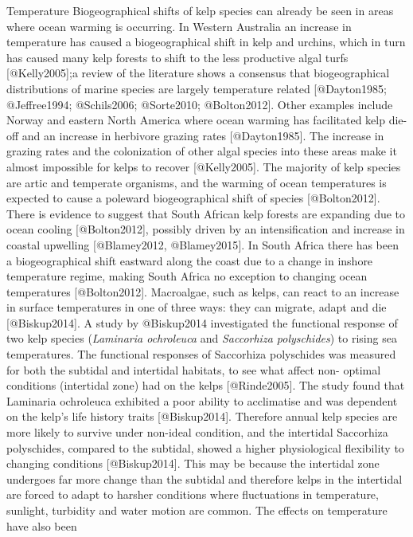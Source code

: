 \documentclass[]{article}
\begin{document}
Temperature Biogeographical shifts of kelp species can already be seen
in areas where ocean warming is occurring. In Western Australia an
increase in temperature has caused a biogeographical shift in kelp and
urchins, which in turn has caused many kelp forests to shift to the less
productive algal turfs {[}@Kelly2005{]};a review of the literature shows
a consensus that biogeographical distributions of marine species are
largely temperature related {[}@Dayton1985; @Jeﬀree1994; @Schils2006;
@Sorte2010; @Bolton2012{]}. Other examples include Norway and eastern
North America where ocean warming has facilitated kelp die-oﬀ and an
increase in herbivore grazing rates {[}@Dayton1985{]}. The increase in
grazing rates and the colonization of other algal species into these
areas make it almost impossible for kelps to recover {[}@Kelly2005{]}.
The majority of kelp species are artic and temperate organisms, and the
warming of ocean temperatures is expected to cause a poleward
biogeographical shift of species {[}@Bolton2012{]}. There is evidence to
suggest that South African kelp forests are expanding due to ocean
cooling {[}@Bolton2012{]}, possibly driven by an intensiﬁcation and
increase in coastal upwelling {[}@Blamey2012, @Blamey2015{]}. In South
Africa there has been a biogeographical shift eastward along the coast
due to a change in inshore temperature regime, making South Africa no
exception to changing ocean temperatures {[}@Bolton2012{]}. Macroalgae,
such as kelps, can react to an increase in surface temperatures in one
of three ways: they can migrate, adapt and die {[}@Biskup2014{]}. A
study by @Biskup2014 investigated the functional response of two kelp
species (\emph{Laminaria ochroleuca} and \emph{Saccorhiza polyschides})
to rising sea temperatures. The functional responses of Saccorhiza
polyschides was measured for both the subtidal and intertidal habitats,
to see what aﬀect non- optimal conditions (intertidal zone) had on the
kelps {[}@Rinde2005{]}. The study found that Laminaria ochroleuca
exhibited a poor ability to acclimatise and was dependent on the kelp's
life history traits {[}@Biskup2014{]}. Therefore annual kelp species are
more likely to survive under non-ideal condition, and the intertidal
Saccorhiza polyschides, compared to the subtidal, showed a higher
physiological ﬂexibility to changing conditions {[}@Biskup2014{]}. This
may be because the intertidal zone undergoes far more change than the
subtidal and therefore kelps in the intertidal are forced to adapt to
harsher conditions where ﬂuctuations in temperature, sunlight, turbidity
and water motion are common. The eﬀects on temperature have also been
\end{document}
